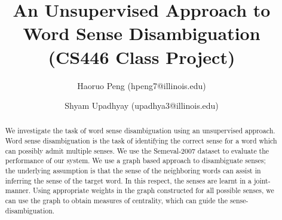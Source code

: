 \documentclass[12pt,letterpaper]{article}
\newcommand{\blue}[1]{\textcolor{RoyalBlue}{#1}}
\newcommand{\instructions}[1]{\blue{\textit{#1}}}
\begin{document}
\title{An Unsupervised Approach to Word Sense Disambiguation \\ \Large{(CS446 Class Project)}}
\author{Haoruo Peng (hpeng7@illinois.edu) \and Shyam Upadhyay (upadhya3@illinois.edu)}
\maketitle
\begin{abstract}
We investigate the task of word sense disambiguation using an unsupervised approach. Word sense disambiguation is the task of identifying the correct sense for a word which can possibly admit multiple senses. We use the Semeval-2007 dataset to evaluate the performance of our system. We use a graph based approach to disambiguate senses; the underlying assumption is that the sense of the neighboring words can assist in inferring the sense of the target word. In this respect, the senses are learnt in a joint-manner. Using appropriate weights in the graph constructed for all possible senses, we can use the graph to obtain measures of centrality, which can guide the sense-disambiguation.
\end{abstract}
\end{document}
